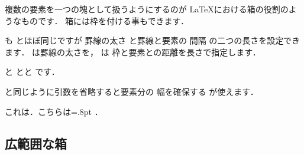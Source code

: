 複数の要素を一つの塊として扱うようにするのが
{\LaTeX}における箱の役割のようなものです．
箱には枠を付ける事もできます．
\begin{Syntax}
\end{Syntax}
 も とほぼ同じですが%
罫線の太さ と罫線と要素の
間隔 の二つの長さを設定できます．
 は罫線の太さを， は%
枠と要素との距離を長さで指定します．%
\begin{InOut}
と
{\fboxrule=3pt}とと
です．
\end{InOut}
 と同じように引数を省略すると要素分の
幅を確保する が使えます．
\begin{Syntax}
\end{Syntax}
\begin{InOut}
これは{\fboxsep=0pt}．こちらは{\fboxrule=.8pt
}．
\end{InOut}

\subsection{広範囲な箱}%

